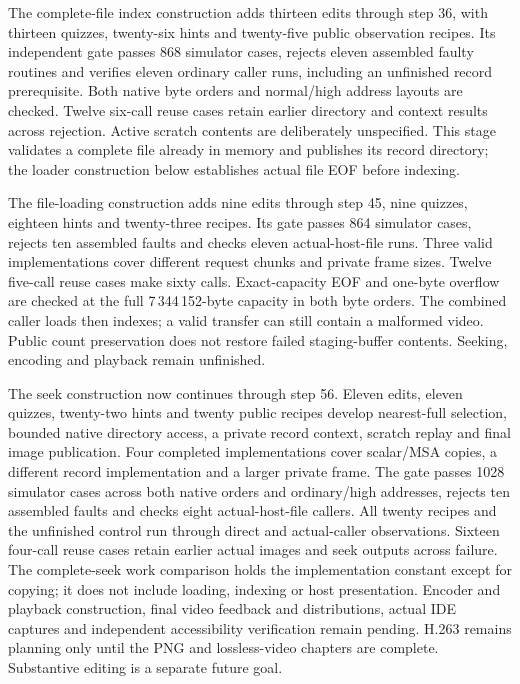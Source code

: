 The complete-file index construction adds thirteen edits through step 36, with
thirteen quizzes, twenty-six hints and twenty-five public observation recipes.
Its independent gate passes 868 simulator cases, rejects eleven assembled faulty
routines and verifies eleven ordinary caller runs, including an unfinished record
prerequisite. Both native byte orders and normal/high address layouts are checked.
Twelve six-call reuse cases retain earlier directory and context results across
rejection. Active scratch contents are deliberately unspecified. This stage
validates a complete file already in memory and publishes its record directory;
the loader construction below establishes actual file EOF before indexing.

The file-loading construction adds nine edits through step 45, nine quizzes,
eighteen hints and twenty-three recipes. Its gate passes 864 simulator cases,
rejects ten assembled faults and checks eleven actual-host-file runs. Three valid
implementations cover different request chunks and private frame sizes. Twelve
five-call reuse cases make sixty calls. Exact-capacity EOF and one-byte overflow
are checked at the full 7\,344\,152-byte capacity in both byte orders. The
combined caller loads then indexes; a valid transfer can still contain a malformed
video. Public count preservation does not restore failed staging-buffer contents.
Seeking, encoding and playback remain unfinished.

The seek construction now continues through step 56. Eleven edits, eleven quizzes,
twenty-two hints and twenty public recipes develop nearest-full selection, bounded
native directory access, a private record context, scratch replay and final image
publication. Four completed implementations cover scalar/MSA copies, a different
record implementation and a larger private frame. The gate passes 1028 simulator
cases across both native orders and ordinary/high addresses, rejects ten assembled
faults and checks eight actual-host-file callers. All twenty recipes and the
unfinished control run through direct and actual-caller observations. Sixteen
four-call reuse cases retain earlier actual images and seek outputs across failure.
The complete-seek work comparison holds the implementation constant except for
copying; it does not include loading, indexing or host presentation. Encoder and
playback construction, final video feedback and distributions, actual IDE captures
and independent accessibility verification remain pending. H.263 remains planning
only until the PNG and lossless-video chapters are complete. Substantive editing
is a separate future goal.

